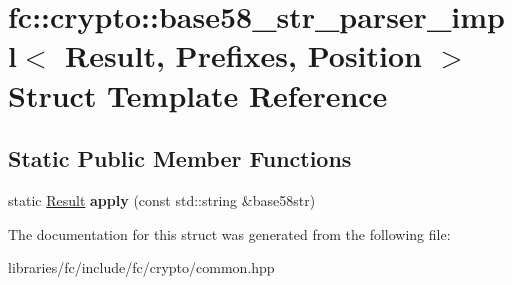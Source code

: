 \hypertarget{structfc_1_1crypto_1_1base58__str__parser__impl_3_01_result_00_01_prefixes_00_01_position_01_4}{}\section{fc\+:\+:crypto\+:\+:base58\+\_\+str\+\_\+parser\+\_\+impl$<$ Result, Prefixes, Position $>$ Struct Template Reference}
\label{structfc_1_1crypto_1_1base58__str__parser__impl_3_01_result_00_01_prefixes_00_01_position_01_4}
\subsection*{Static Public Member Functions}
\begin{DoxyCompactItemize}
\item 
\mbox{\label{structfc_1_1crypto_1_1base58__str__parser__impl_3_01_result_00_01_prefixes_00_01_position_01_4_ac82ed0d2890d6491eed39aed38d9c030}} 
static \mbox{\hyperlink{struct_result}{Result}} {\bfseries apply} (const std\+::string \&base58str)
\end{DoxyCompactItemize}


The documentation for this struct was generated from the following file\+:\begin{DoxyCompactItemize}
\item 
libraries/fc/include/fc/crypto/common.\+hpp\end{DoxyCompactItemize}

